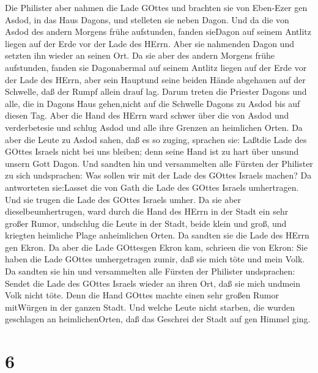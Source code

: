  Die Philister aber nahmen die Lade GOttes und brachten sie
von Eben-Ezer gen Asdod,  in das Haus Dagons, und stelleten
sie neben Dagon.  Und da die von Asdod des andern Morgens
frühe aufstunden, fanden sieDagon auf seinem Antlitz liegen auf der Erde
vor der Lade des HErrn. Aber sie nahmenden Dagon und setzten ihn wieder
an seinen Ort.  Da sie aber des andern Morgens frühe
aufstunden, fanden sie Dagonabermal auf seinem Antlitz liegen auf der
Erde vor der Lade des HErrn, aber sein Hauptund seine beiden Hände
abgehauen auf der Schwelle, daß der Rumpf allein drauf lag. 
Darum treten die Priester Dagons und alle, die in Dagons Haus
gehen,nicht auf die Schwelle Dagons zu Asdod bis auf diesen Tag.
 Aber die Hand des HErrn ward schwer über die von Asdod und
verderbetesie und schlug Asdod und alle ihre Grenzen an heimlichen
Orten.  Da aber die Leute zu Asdod sahen, daß es so zuging,
sprachen sie: Laßtdie Lade des GOttes Israels nicht bei uns bleiben;
denn seine Hand ist zu hart über unsund unsern Gott Dagon. 
Und sandten hin und versammelten alle Fürsten der Philister zu sich
undsprachen: Was sollen wir mit der Lade des GOttes Israels machen? Da
antworteten sie:Lasset die von Gath die Lade des GOttes Israels
umhertragen.  Und sie trugen die Lade des GOttes Israels
umher. Da sie aber dieselbeumhertrugen, ward durch die Hand des HErrn in
der Stadt ein sehr großer Rumor, undschlug die Leute in der Stadt, beide
klein und groß, und kriegten heimliche Plage anheimlichen Orten.
 Da sandten sie die Lade des HErrn gen Ekron. Da aber die
Lade GOttesgen Ekron kam, schrieen die von Ekron: Sie haben die Lade
GOttes umhergetragen zumir, daß sie mich töte und mein Volk.
 Da sandten sie hin und versammelten alle Fürsten der
Philister undsprachen: Sendet die Lade des GOttes Israels wieder an
ihren Ort, daß sie mich undmein Volk nicht töte. Denn die Hand GOttes
machte einen sehr großen Rumor mitWürgen in der ganzen Stadt.
 Und welche Leute nicht starben, die wurden geschlagen an
heimlichenOrten, daß das Geschrei der Stadt auf gen Himmel ging.

\hypertarget{section-5}{%
\section{6}\label{section-5}}

